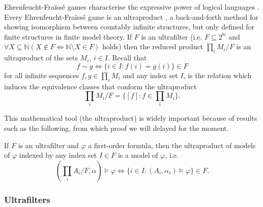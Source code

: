 Ehrenfeucht-Fra\"iss\'e games characterise the expressive power of logical languages \cite{ams}. Every Ehrenfeucht-Fra\"iss\'e game is an ultraproduct \cite{models}, a back-and-forth method for showing isomorphism between countably infinite structures, but only defined for finite structures in finite model theory. If $F$ is an ultrafilter (i.e. $F\subseteq 2^{\mathbb{N}}$ and $\forall X\subseteq\mathbb{N} (X\notin F \Leftrightarrow \mathbb{N}\setminus X\in F)$ holds) then the reduced product $\prod_{i}M_i / F$ is an ultraproduct of the sets $M_i$, $i\in I$. Recall that \[f\sim g \Leftrightarrow \{i\in I : f(i) = g(i)\}\in F\] for all infinite sequences $f,g\in\prod_i M_i$ and any index set $I$, is the relation which induces the equivalence classes that conform the ultraproduct \[\prod_{i}M_i / F = \{[f]:f\in\prod_i M_i\}.\] 

This mathematical tool (the ultraproduct) is widely important because of results such as the following, from which proof we will delayed for the moment.

\begin{lem}[$\L$o\'s Lemma]
If $F$ is an ultrafilter and $\varphi$ a first-order formula, then the ultraproduct of models of $\varphi$ indexed by any index set $I\in F$ is a model of $\varphi$, i.e. \[(\prod_i A_i / F , \alpha)\models\varphi\Leftrightarrow\{i\in I: (A_i, \alpha_i)\models\varphi\}\in F.\]
\end{lem}

\subsubsection{Ultrafilters}


